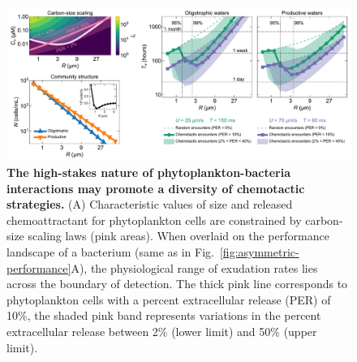 \documentclass[9pt,twocolumn,twoside]{pnas-new}
\begin{document}
\begin{figure}
    \centering
    \includegraphics[width=17.8cm]{fig5_mod.pdf}
    \caption{
        \textbf{
        The high-stakes nature of phytoplankton-bacteria interactions may promote a diversity of chemotactic strategies.
        }
        (A) Characteristic values of size and released chemoattractant for phytoplankton cells are constrained by carbon-size scaling laws (pink areas). When overlaid on the performance landscape of a bacterium (same as in Fig.~\ref{fig:asymmetric-performance}A), the physiological range of exudation rates lies across the boundary of detection.
        The thick pink line corresponds to phytoplankton cells with a percent extracellular release (PER) of 10\%, the shaded pink band represents variations in the percent extracellular release between 2\% (lower limit) and 50\% (upper limit).
}
\end{figure}
\end{document}
